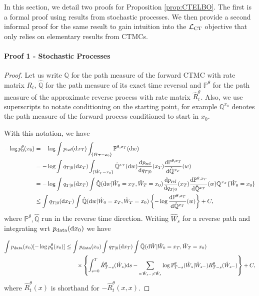 \documentclass{article}
\newcommand{\rd}{\mathrm{d}}
\begin{document}
In this section, we detail two proofs for Proposition \ref{prop:CTELBO}. The first is a formal proof using results from stochastic processes. We then provide a second informal proof for the same result to gain intuition into the $\mathcal{L}_{\textup{CT}}$ objective that only relies on elementary results from CTMCs.



\paragraph{Proof 1 - Stochastic Processes}

\begin{proof} Let us write $\mathbb{Q}$ for the path measure of the forward CTMC with rate matrix $R_t$, $\hat{\mathbb{Q}}$ for the path measure of its exact time reversal and $\mathbb{P}^{\theta}$ for the path measure of the approximate reverse process with rate matrix $\hat R^\theta_t$. Also, we use superscripts to notate conditioning on the starting point, for example $\mathbb{Q}^{x_0}$ denotes the path measure of the forward process conditioned to start in $x_0$.

With this notation, we have 
\begin{align}
-\log p_0^\theta (x_0)
&=-\log \int \pref(\rd x_T) \int_{\{\hat W_T=x_0\}} \mathbb{P}^{\theta,x_T}( \rd w)\\
&=-\log \int q_{T|0}(\rd x_T) \int_{\{\hat W_T=x_0\}} \hat{\mathbb{Q}}^{x_T}( \rd w) \frac{\rd \pref}{\rd q_{T|0}}(x_T) \frac{\rd \mathbb{P}^{\theta,x_T}}{\rd \hat{\mathbb{Q}}^{x_T}}(w)\\
&=-\log \int q_{T|0}(\rd x_T) \int 
\hat{\mathbb{Q}}( \rd w| \hat W_0=x_T, \hat W_T=x_0) \frac{\rd \pref}{\rd q_{T|0}}(x_T) \frac{\rd \mathbb{P}^{\theta,x_T}}{\rd \hat{\mathbb{Q}}^{x_T}}(w) \mathbb{Q}^{x_T}\{\hat W_0=x_0\}\\
&\leq \int q_{T|0}(\rd x_T) \int 
\hat{\mathbb{Q}}(\rd w| \hat W_0=x_T, \hat W_T=x_0) \left\{
-\log \frac{\rd \mathbb{P}^{\theta,x_T}}{\rd \hat{\mathbb{Q}}^{x_T}}(w)\right\} + C,
\end{align}    
where $\mathbb{P}^{\theta}, \hat{\mathbb{Q}}$ run in the reverse time direction. Writing $\hat{W}_s$ for a reverse path and integrating wrt $\pdata(\rd x_0)$ we have

\begin{align}
\int \pdata(x_0)[ -\log p_0^\theta (x_0)]
&\leq \int \pdata(x_0) \int q_{T|0}(\rd x_T) \int 
\hat{\mathbb{Q}}( \rd \hat{W}| \hat{W}_0=x_T, \hat{W}_T=x_0) \\
&\qquad \times
\left\{
\int_{s=0}^T \hat R_{T-s}^\theta(\hat{W}_s) \rd s -
\sum_{s: \hat{W}_{s-}\neq \hat{W}_s} 
\log \mathbb{P}_{T-s}^{\theta}(\hat{W}_s | \hat{W}_{s-}) R_{T-s}^{\theta}(\hat{W}_{s-})
\right\} + C,
\end{align}
where $\hat R_t^\theta(x)$ is shorthand for $- \hat R_{t}^\theta(x,x)$.


\end{proof}
\end{document}
